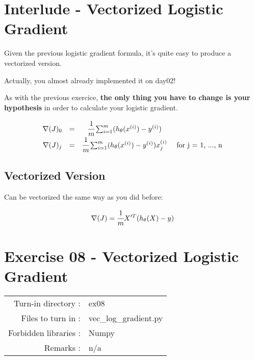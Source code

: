 \documentclass[]{article}
\begin{document}
\clearpage

\hypertarget{interlude---vectorized-logistic-gradient-1}{%
\section{Interlude - Vectorized Logistic
Gradient}\label{interlude---vectorized-logistic-gradient-1}}

Given the previous logistic gradient formula, it's quite easy to produce
a vectorized version.

Actually, you almost already implemented it on day02!

As with the previous exercice, \textbf{the only thing you have to change
is your hypothesis} in order to calculate your logistic gradient.

\large

\[
\begin{matrix}
\nabla(J)_0 &  = &\cfrac{1}{m}\sum_{i=1}^{m}(h_{\theta}(x^{(i)}) - y^{(i)}) & \\
\nabla(J)_j & = &\cfrac{1}{m}\sum_{i=1}^{m}(h_{\theta}(x^{(i)}) - y^{(i)})x_{j}^{(i)} & \text{ for j = 1, ..., n}    
\end{matrix}
\] \normalsize

\hypertarget{vectorized-version}{%
\subsection{Vectorized Version}\label{vectorized-version}}

Can be vectorized the same way as you did before:

\large

\[
\nabla(J) = \cfrac{1}{m} X'^T(h_\theta(X) - y)
\] \normalsize

\clearpage

\hypertarget{exercise-08---vectorized-logistic-gradient-1}{%
\section{Exercise 08 - Vectorized Logistic
Gradient}\label{exercise-08---vectorized-logistic-gradient-1}}

\begin{longtable}[]{@{}rl@{}}
\toprule
\endhead
Turn-in directory : & ex08\tabularnewline
Files to turn in : & vec\_log\_gradient.py\tabularnewline
Forbidden libraries : & Numpy\tabularnewline
Remarks : & n/a\tabularnewline
\bottomrule
\end{longtable}
\end{document}
